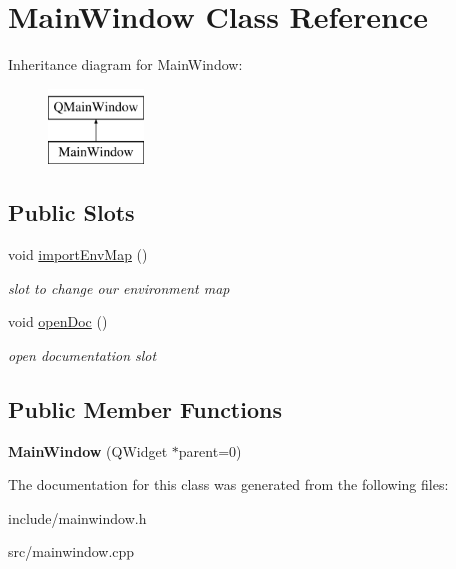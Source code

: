 \hypertarget{class_main_window}{\section{Main\-Window Class Reference}
\label{class_main_window}
}
Inheritance diagram for Main\-Window\-:\begin{figure}[H]
\begin{center}
\leavevmode
\includegraphics[height=2.000000cm]{class_main_window}
\end{center}
\end{figure}
\subsection*{Public Slots}
\begin{DoxyCompactItemize}
\item 
\hypertarget{class_main_window_a0ba57a99a109b440f8fa0c4cc05096c7}{void \hyperlink{class_main_window_a0ba57a99a109b440f8fa0c4cc05096c7}{import\-Env\-Map} ()}\label{class_main_window_a0ba57a99a109b440f8fa0c4cc05096c7}

\begin{DoxyCompactList}\small\item\em slot to change our environment map \end{DoxyCompactList}\item 
\hypertarget{class_main_window_a452fc3db76653e3355cd9eb81bc4f0cf}{void \hyperlink{class_main_window_a452fc3db76653e3355cd9eb81bc4f0cf}{open\-Doc} ()}\label{class_main_window_a452fc3db76653e3355cd9eb81bc4f0cf}

\begin{DoxyCompactList}\small\item\em open documentation slot \end{DoxyCompactList}\end{DoxyCompactItemize}
\subsection*{Public Member Functions}
\begin{DoxyCompactItemize}
\item 
\hypertarget{class_main_window_a8b244be8b7b7db1b08de2a2acb9409db}{{\bfseries Main\-Window} (Q\-Widget $\ast$parent=0)}\label{class_main_window_a8b244be8b7b7db1b08de2a2acb9409db}

\end{DoxyCompactItemize}


The documentation for this class was generated from the following files\-:\begin{DoxyCompactItemize}
\item 
include/mainwindow.\-h\item 
src/mainwindow.\-cpp\end{DoxyCompactItemize}
